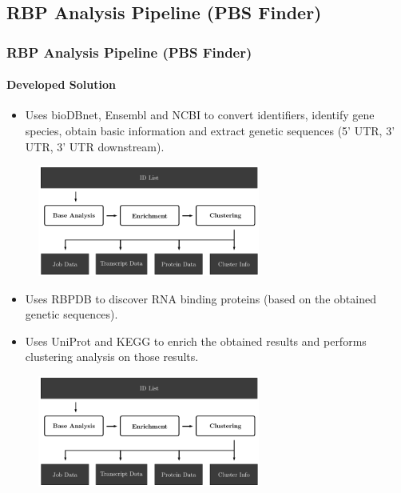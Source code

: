 \documentclass[xcolor=dvipsnames]{beamer}
\begin{document}
\subsection{RBP Analysis Pipeline (PBS Finder)}
\begin{frame}[allowframebreaks]
  \frametitle{RBP Analysis Pipeline (PBS Finder)}
  \framesubtitle{Developed Solution}

\begin{itemize}
\item
Uses bioDBnet, Ensembl and NCBI to convert identifiers, identify gene species,
obtain basic information and extract genetic sequences (5' UTR, 3' UTR, 3' UTR
downstream).
\end{itemize}\vspace{0.23cm}

\begin{figure}
  \centering
  \includegraphics[width=0.65\textwidth]{workflow2}
\end{figure}

\framebreak

\begin{itemize}
\item
Uses RBPDB to discover RNA binding proteins (based on the obtained genetic
sequences).

\item
Uses UniProt and KEGG to enrich the obtained results and performs clustering
analysis on those results.
\end{itemize}

\begin{figure}
  \centering
  \includegraphics[width=0.65\textwidth]{workflow2}
\end{figure}


\end{frame}
\end{document}
